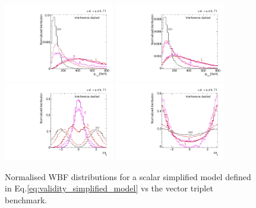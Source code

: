 \begin{figure}[t]
  \includegraphics[width=0.43\textwidth]{fig/validity/WBF_simplified_j1pt.pdf}
  \hspace*{0.05\textwidth}
  \includegraphics[width=0.43\textwidth]{fig/validity/WBF_simplified_Hpt.pdf} \\
  \includegraphics[width=0.43\textwidth]{fig/validity/WBF_simplified_deltaEtaJJ.pdf}
  \hspace*{0.05\textwidth}
  \includegraphics[width=0.43\textwidth]{fig/validity/WBF_simplified_deltaPhiJJ.pdf}
  \caption{Normalised WBF distributions for a scalar simplified model
    defined in Eq.\;\eqref{eq:validity_simplified_model} vs the vector triplet
    benchmark.}
  \label{fig:validity_simplified}
\end{figure}

